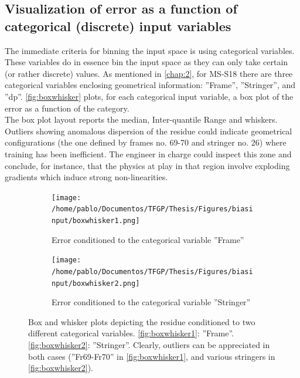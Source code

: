 \subsection{Visualization of error as a function of categorical (discrete) input variables}
The immediate criteria for binning the input space is using categorical variables. These variables do in essence bin the input space as they can only take certain (or rather discrete) values. As mentioned in \autoref{chap:2}, for MS-S18 there are three categorical variables enclosing geometrical information: ''Frame'', ''Stringer'', and ''dp''. \autoref{fig:boxwhisker} plots, for each categorical input variable, a box plot of the error as a function of the category.\\
\indent The box plot layout reports the median, Inter-quantile Range and whiskers. Outliers showing anomalous dispersion of the residue could indicate geometrical configurations (\eg the one defined by frames no. 69-70 and stringer no. 26) where training has been inefficient. The engineer in charge could inspect this zone and conclude, for instance, that the physics at play in that region involve exploding gradients which induce strong non-linearities.\\
\begin{figure}
	\centering
	\begin{subfigure}[b]{\textwidth}
		\centering
		\texttt{[image: /home/pablo/Documentos/TFGP/Thesis/Figures/biasinput/boxwhisker1.png]}
		\caption{Error conditioned to the categorical variable ''Frame''}
		\label{fig:boxwhisker1}
	\end{subfigure}
	
	\vspace{1cm} %
	
	\begin{subfigure}[b]{\textwidth}
		\centering
		\texttt{[image: /home/pablo/Documentos/TFGP/Thesis/Figures/biasinput/boxwhisker2.png]}
		\caption{Error conditioned to the categorical variable ''Stringer''}
		\label{fig:boxwhisker2}
	\end{subfigure}
	
	\caption{Box and whisker plots depicting the residue conditioned to two different categorical variables. \autoref{fig:boxwhisker1}: ''Frame''. \autoref{fig:boxwhisker2}: ''Stringer''. Clearly, outliers can be appreciated in both cases (''Fr69-Fr70'' in \autoref{fig:boxwhisker1}, and various stringers in \autoref{fig:boxwhisker2}).}
	\label{fig:boxwhisker}
\end{figure}
%
\FloatBarrier
